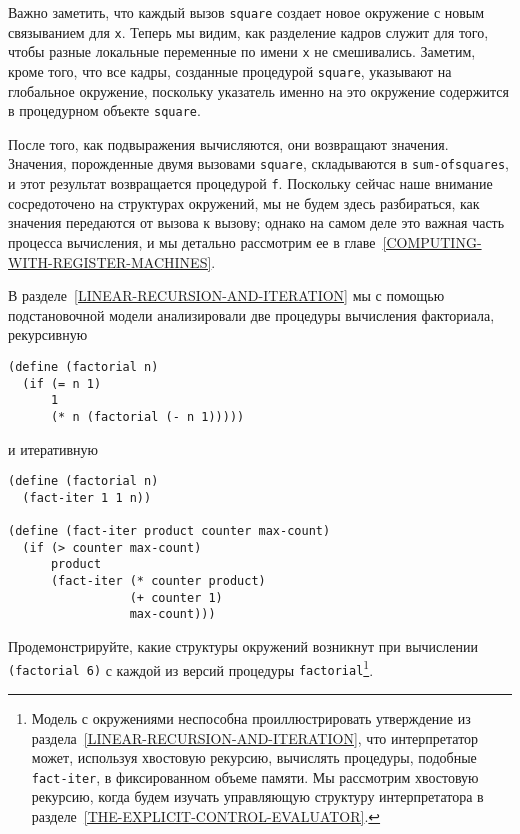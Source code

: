 Важно заметить, что каждый вызов {\tt square}
создает новое окружение с новым связыванием для {\tt x}.
Теперь мы видим, как разделение кадров служит для того, чтобы разные
локальные переменные по имени {\tt x} не смешивались.  Заметим,
кроме того, что все кадры, созданные процедурой
{\tt square}, указывают на глобальное окружение, поскольку
указатель именно на это окружение содержится в процедурном
объекте {\tt square}.

После того, как подвыражения вычисляются, они возвращают
значения.  Значения, порожденные двумя вызовами
{\tt square}, складываются в {\tt sum-of\-squares}, и
этот результат возвращается процедурой {\tt f}.  Поскольку
сейчас наше внимание сосредоточено на структурах окружений, мы не
будем здесь разбираться, как значения передаются от вызова к вызову; однако
на самом деле это важная часть процесса вычисления, и мы детально
рассмотрим ее в главе~\ref{COMPUTING-WITH-REGISTER-MACHINES}.
\begin{exercise}{3.9}\label{EX3.9}%
%
%
В разделе~\ref{LINEAR-RECURSION-AND-ITERATION} мы с помощью
подстановочной модели анализировали две процедуры вычисления
факториала, рекурсивную

\begin{Verbatim}[fontsize=\small]
(define (factorial n)
  (if (= n 1)
      1
      (* n (factorial (- n 1)))))
\end{Verbatim}
и итеративную

\begin{Verbatim}[fontsize=\small]
(define (factorial n)
  (fact-iter 1 1 n))

(define (fact-iter product counter max-count)
  (if (> counter max-count)
      product
      (fact-iter (* counter product)
                 (+ counter 1)
                 max-count)))
\end{Verbatim}
Продемонстрируйте, какие структуры окружений возникнут при вычислении
{\tt (fac\-to\-rial 6)} с каждой из версий процедуры
{\tt factorial}\footnote{Модель с окружениями неспособна проиллюстрировать
утверждение из раздела~\ref{LINEAR-RECURSION-AND-ITERATION}, что
интерпретатор может, используя
хвостовую рекурсию, вычислять
процедуры, подобные {\tt fact-iter}, в фиксированном объеме
памяти.  Мы рассмотрим
хвостовую рекурсию, когда будем изучать
управляющую структуру интерпретатора в
разделе~\ref{THE-EXPLICIT-CONTROL-EVALUATOR}.}.
\end{exercise}

